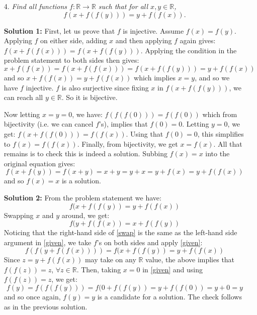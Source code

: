 \documentclass[a4paper,12pt]{article}
\begin{document}
\begin{enumerate}
  \item[4.] \emph{Find all functions $f: \mathbb{R} \to \mathbb{R}$ such that for all $x,y \in \mathbb{R}$,
\[ f(x+f(f(y))) = y+f(f(x)). \]}

  \textbf{Solution 1:} First, let us prove that $f$ is injective. Assume $f(x)=f(y)$. Applying $f$ on either side, adding $x$ and then applying $f$ again gives: $f(x+f(f(x))) = f(x+f(f(y)))$. Applying the condition in the problem statement to both sides then gives:  
  \begin{equation*}
    x+f(f(x)) = f(x+f(f(x))) = f(x+f(f(y))) = y+f(f(x)) 
  \end{equation*} 
  and so $x+f(f(x)) = y+f(f(x))$ which implies $x=y$, and so we have $f$ injective. $f$ is also surjective since fixing $x$ in $f(x+f(f(y)))$, we can reach all $y \in  \mathbb{R}$. So it is bijective.
  
  Now letting $x=y=0$, we have: $f(f(f(0))) = f(f(0))$ which from bijectivity (i.e. we can cancel $f$'s), implies that $f(0)=0$. Letting $y=0$, we get: $f(x+f(f(0))) = f(f(x))$. Using that $f(0)=0$, this simplifies to $f(x)=f(f(x))$. Finally, from bijectivity, we get $x=f(x)$. All that remains is to check this is indeed a solution. Subbing $f(x)=x$ into the original equation gives:
  \begin{equation*}
    f(x+f(y)) = f(x+y) = x+y = y+x = y+f(x) = y+f(f(x))
  \end{equation*}
  and so $f(x)=x$ is a solution.
  
  \textbf{Solution 2:}
  From the problem statement we have: 
  \begin{equation}\label{given}
    f(x+f(f(y)) = y+f(f(x))
  \end{equation} 
  Swapping $x$ and $y$ around, we get: 
  \begin{equation}\label{swap}
    f(y+f(f(x)) = x+f(f(y))
  \end{equation} 
  Noticing that the right-hand side of \eqref{swap} is the same as the left-hand side argument in \eqref{given}, we take $f$'s on both sides and apply \eqref{given}:
  \begin{equation*}
    f(f(y+f(f(x)))) = f(x+f(f(y)) = y+f(f(x))
  \end{equation*}
  Since $z = y+f(f(x))$ may take on any $\mathbb{R}$ value, the above implies that $f(f(z)) = z$, $\forall z\in \mathbb{R}$. Then, taking $x=0$ in \eqref{given} and using $f(f(z))=z$, we get:
  \begin{equation*}
    f(y) = f(f(f(y))) = f(0+f(f(y)) = y+f(f(0)) = y +0 = y
  \end{equation*} 
  and so once again, $f(y)=y$ is a candidate for a solution. The check follows as in the previous solution.
  


\end{enumerate}
\end{document}
